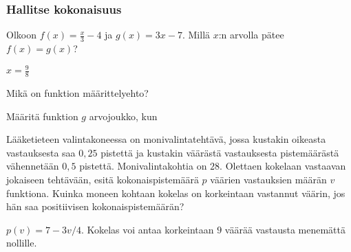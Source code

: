 \begin{tehtavasivu}
\begin{tehtava}
  \begin{vastaus}
  \end{vastaus} 
\end{tehtava}

\subsubsection*{Hallitse kokonaisuus}

\begin{tehtava}
  Olkoon $f(x)=\frac{x}{3}-4$ ja $g(x)=3x-7$. Millä $x$:n arvolla pätee $ f(x)=g(x)$?
  \begin{vastaus}
$x=\frac{9}{8}$
  \end{vastaus}
\end{tehtava}

\begin{tehtava}
  Mikä on funktion määrittelyehto?

  \begin{vastaus}
  \end{vastaus}
\end{tehtava}

\begin{tehtava}
	Määritä funktion $g$ arvojoukko, kun
	
	\begin{vastaus}
	\end{vastaus}
\end{tehtava}

\begin{tehtava}
	Lääketieteen valintakoneessa on monivalintatehtävä, jossa kustakin oikeasta vastauksesta saa $0,25$ pistettä ja kustakin väärästä vastauksesta pistemäärästä vähennetään $0,5$ pistettä. Monivalintakohtia on $28$. Olettaen kokelaan vastaavan jokaiseen tehtävään, esitä kokonaispistemäärä $p$ väärien vastauksien määrän $v$ funktiona. Kuinka moneen kohtaan kokelas on korkeintaan vastannut väärin, jos hän saa positiivisen kokonaispistemäärän?
	\begin{vastaus}
		$p(v) = 7-3v/4$. Kokelas voi antaa korkeintaan $9$ väärää vastausta menemättä nollille.
	\end{vastaus}
\end{tehtava}


\end{tehtavasivu}
